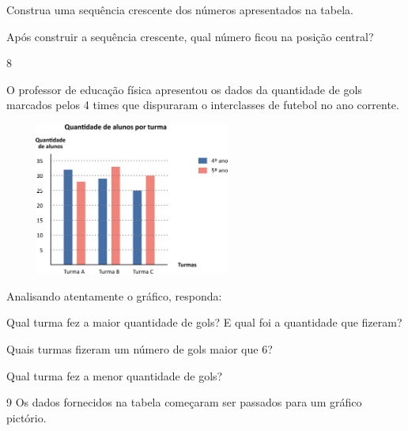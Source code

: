 \begin{multicols}{2}
{\begin{escolha}
{\begin{escolha}
\item
  Construa uma sequência crescente dos números apresentados na tabela.

\item
  Após construir a sequência crescente, qual número ficou na posição
  central?
\end{escolha}

\num{8}

O professor de educação física apresentou os dados da quantidade de gols
marcados pelos 4 times que dispuraram o interclasses de futebol no ano
corrente.


\includegraphics[width=3.30769in,height=1.97201in]{media/image97.png}

Analisando atentamente o gráfico, responda:

\begin{escolha}

\item
  Qual turma fez a maior quantidade de gols? E qual foi a quantidade que
  fizeram?

\item
  Quais turmas fizeram um número de gols maior que 6?

\item
  Qual turma fez a menor quantidade de gols?
\end{escolha}

\num{9} Os dados fornecidos na tabela começaram ser passados para um
gráfico pictório.

}
\end{escolha}}
\end{multicols}
